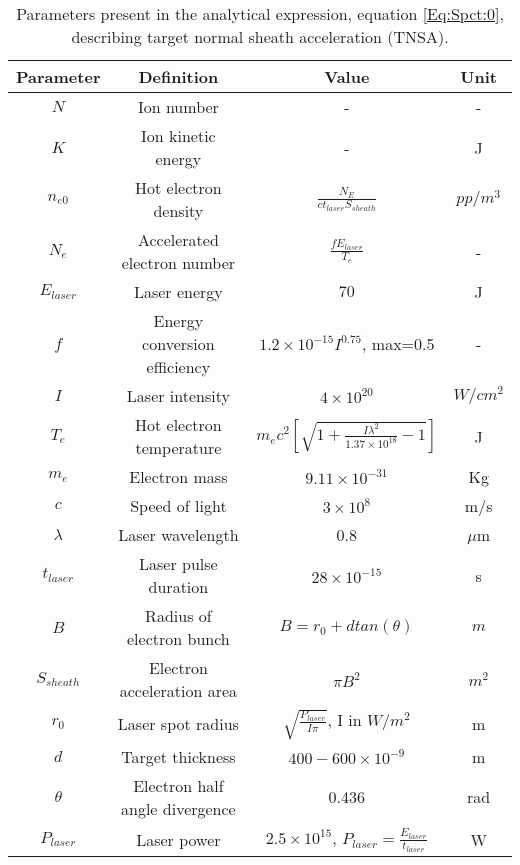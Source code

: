 \begin{table} 
  \caption{
    Parameters present in the analytical expression,
    equation \ref{Eq:Spct:0}, describing target normal sheath
    acceleration (TNSA).
  }
  \label{table:EnergySpectrumParameters}
  \begin{center}
    \begin{tabular}{c c c c}
      \hline
      \textbf{Parameter} & \textbf{Definition} & \textbf{Value} & \textbf{Unit} \\ [1ex] 
      \hline \hline
      $N$ & Ion number & - & - \\ 
      $K$ & Ion kinetic energy & - & J \\  
      $n_{e0}$ & Hot electron density & $\frac{N_{E}}{c t_{laser} S_{sheath}}$ & $pp/m^3$ \\ 
      $N_{e}$ & Accelerated electron number & $\frac{f E_{laser}}{T_e}$ & - \\ 
      $E_{laser}$ & Laser energy & $70$ & J \\  
      $f$ & Energy conversion efficiency & $1.2 \times 10^{-15} I^{0.75}$, max=0.5  & - \\   %
      $I$ & Laser intensity & $4 \times 10^{20}$ & $W/cm^{2}$ \\ 
      $T_{e}$ & Hot electron temperature & $m_{e} c^{2} [\sqrt{1 + \frac{I \lambda^{2}}{1.37 \times 10^{18}} -1} ]$ & J \\ 
      $m_{e}$ & Electron mass & $9.11 \times 10^{-31}$ & Kg \\ 
      $c$ & Speed of light & $3 \times 10^{8}$ & m/s \\ 
      $\lambda$ & Laser wavelength & 0.8 & $\mu$m \\  
      $t_{laser}$ & Laser pulse duration & $28 \times 10^{-15}$  & s \\  
      $B$ & Radius of electron bunch & $B=r_{0} + d tan(\theta)$ & $m$ \\ 
      $S_{sheath}$ & Electron acceleration area & $\pi B^{2}$ & $m^{2}$ \\ 
      $r_{0}$ & Laser spot radius & $\sqrt{\frac{P_{laser}}{I \pi}}$, I in $W/m^{2}$ & m \\  
      $d$ & Target thickness & $400-600 \times 10^{-9}$ & m \\  
      $\theta$ & Electron half angle divergence & 0.436 & rad \\  
      $P_{laser}$ & Laser power & $2.5 \times 10^{15}$, $P_{laser}=\frac{E_{laser}}{t_{laser}}$ & W \\  

\end{tabular}
\end{center}
\end{table}
